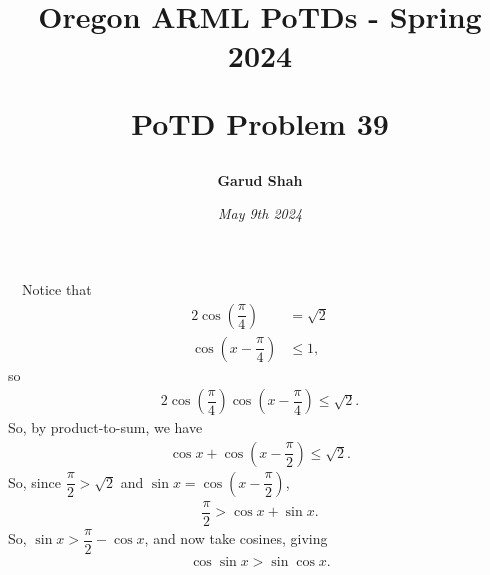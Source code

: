\documentclass{article}
\title{\begin{center}
    Oregon ARML PoTDs - Spring 2024
\end{center}
\begin{center}
    \textbf{PoTD Problem 39}
\end{center}}
\author{\textbf{Garud Shah}}
\date{\textit{May 9th 2024}}
\begin{document}
\maketitle
$\text{ }$ \newline
Notice that 
\begin{align} 
    2 \cos \left(\dfrac{\pi}{4}\right) &= \sqrt{2} \\
    \cos \left( x - \dfrac{\pi}{4} \right) &\le 1,
\end{align}
so 
\begin{align}
    2 \cos \left(\dfrac{\pi}{4}\right) \cos \left(x - \dfrac{\pi}{4} \right) \le \sqrt{2}.
\end{align} 
So, by product-to-sum, we have 
\begin{align}
    \cos x + \cos \left(x - \dfrac{\pi}{2} \right) \le \sqrt{2}.
\end{align} 
So, since $\dfrac{\pi}{2} > \sqrt{2}$ and $\sin x = \cos \left( x - \dfrac{\pi}{2} \right)$,
\begin{align}
    \dfrac{\pi}{2} > \cos x + \sin x.
\end{align} 
So, $\sin x > \dfrac{\pi}{2} - \cos x$, and now take cosines, giving 
\begin{align}
    \boxed{\cos \sin x > \sin \cos x}.
\end{align}
\end{document}
